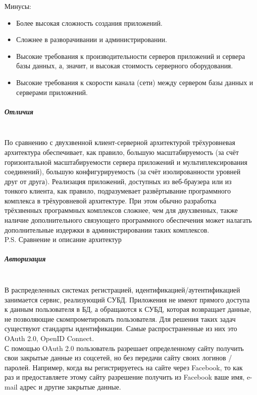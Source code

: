 Минусы:
\begin{itemize}
    \item Более высокая сложность создания приложений.
    \item Сложнее в разворачивании и администрировании.
    \item Высокие требования к производительности серверов приложений и сервера базы данных, а, значит, и высокая стоимость серверного оборудования.
    \item Высокие требования к скорости канала (сети) между сервером базы данных и серверами приложений.
\end{itemize}

\subparagraph{Отличия}~\\

По сравнению с двухзвенной клиент-серверной архитектурой трёхуровневая архитектура
обеспечивает, как правило, большую масштабируемость (за счёт горизонтальной
масштабируемости сервера приложений и мультиплексирования соединений), большую
конфигурируемость (за счёт изолированности уровней друг от друга). Реализация
приложений, доступных из веб-браузера или из тонкого клиента, как правило,
подразумевает развёртывание программного комплекса в трёхуровневой архитектуре. При
этом обычно разработка трёхзвенных программных комплексов сложнее, чем для
двухзвенных, также наличие дополнительного связующего программного обеспечения
может налагать дополнительные издержки в администрировании таких комплексов.~\\

P.S. Сравнение и описание архитектур \autocite{ClientServerArchitecture}

\subparagraph{Авторизация}~\\

В распределенных системах регистрацией, идентификацией/аутентификацией занимается
сервис, реализующий СУБД. Приложения не имеют прямого доступа к данным
пользователя в БД, а обращаются к СУБД, которая возвращает данные, не позволяющие
скомпрометировать пользователя. Для решения таких задач существуют стандарты
идентификации. Самые распространенные из них это OAuth 2.0, OpenID Connect.~\\

С помощью OAuth 2.0 пользователь разрешает определенному сайту получить свои
закрытые данные из соцсетей, но без передачи сайту своих логинов / паролей. Например,
когда вы регистрируетесь на сайте через Facebook, то как раз и предоставляете этому сайту
разрешение получить из Facebook ваше имя, e-mail адрес и другие закрытые данные.~\\

